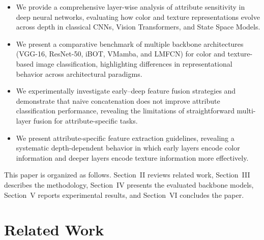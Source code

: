 \documentclass[conference]{IEEEtran}
\begin{document}
\begin{itemize}
    \item We provide a comprehensive layer-wise analysis of attribute sensitivity in deep neural networks, evaluating how color and texture representations evolve across depth in classical CNNs, Vision Transformers, and State Space Models.

    \item We present a comparative benchmark of multiple backbone architectures (VGG-16, ResNet-50, iBOT, VMamba, and LMFCN) for color and texture-based image classification, highlighting differences in representational behavior across architectural paradigms.

    \item We experimentally investigate early–deep feature fusion strategies and demonstrate that naive concatenation does not improve attribute classification performance, revealing the limitations of straightforward multi-layer fusion for attribute-specific tasks.

    \item We present attribute-specific feature extraction guidelines, revealing a systematic depth-dependent behavior in which early layers encode color information and deeper layers encode texture information more effectively.
\end{itemize}

This paper is organized as follows. Section~II reviews related work, Section~III describes the methodology, Section~IV presents the evaluated backbone models, Section~V reports experimental results, and Section~VI concludes the paper.



\section{Related Work}

\end{document}
